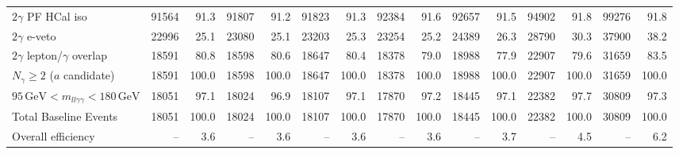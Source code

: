 \begin{table}[htbp]
{\begin{tabular}{lrrrrrrrrrrrrrr}
$2\gamma$ PF HCal iso & 91564 & 91.3 & 91807 & 91.2 & 91823 & 91.3 & 92384 & 91.6 & 92657 & 91.5 & 94902 & 91.8 & 99276 & 91.8 \\
$2\gamma$ e-veto & 22996 & 25.1 & 23080 & 25.1 & 23203 & 25.3 & 23254 & 25.2 & 24389 & 26.3 & 28790 & 30.3 & 37900 & 38.2 \\
$2\gamma$ lepton/$\gamma$ overlap & 18591 & 80.8 & 18598 & 80.6 & 18647 & 80.4 & 18378 & 79.0 & 18988 & 77.9 & 22907 & 79.6 & 31659 & 83.5 \\
$N_{\gamma}\geq 2$ ($a$ candidate) & 18591 & 100.0 & 18598 & 100.0 & 18647 & 100.0 & 18378 & 100.0 & 18988 & 100.0 & 22907 & 100.0 & 31659 & 100.0 \\
$95\,\mathrm{GeV} < m_{ll\gamma\gamma} < 180\,\mathrm{GeV}$ & 18051 & 97.1 & 18024 & 96.9 & 18107 & 97.1 & 17870 & 97.2 & 18445 & 97.1 & 22382 & 97.7 & 30809 & 97.3 \\
Total Baseline Events & 18051 & 100.0 & 18024 & 100.0 & 18107 & 100.0 & 17870 & 100.0 & 18445 & 100.0 & 22382 & 100.0 & 30809 & 100.0 \\
\hline
Overall efficiency & -- & 3.6 & -- & 3.6 & -- & 3.6 & -- & 3.6 & -- & 3.7 & -- & 4.5 & -- & 6.2 \\
\hline
\end{tabular}%
}
\end{table}


